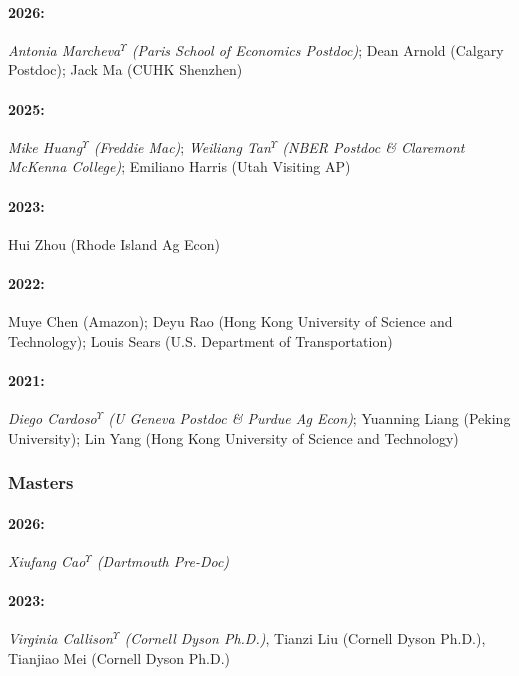 \documentclass[11pt]{res} %
\begin{document}
\begin{resume}
\paragraph{2026:} \textit{Antonia Marcheva$^\Upsilon$ (Paris School of Economics Postdoc)}; Dean Arnold (Calgary Postdoc); Jack Ma (CUHK Shenzhen)
\vspace{-.35in}
\paragraph{2025:} \textit{{Mike Huang}$^\Upsilon$ (Freddie Mac)}; \textit{Weiliang Tan$^\Upsilon$ (NBER Postdoc \& Claremont McKenna College)}; Emiliano Harris (Utah Visiting AP)
\vspace{-.35in}
\paragraph{2023:} Hui Zhou (Rhode Island Ag Econ)
\vspace{-.35in}
\paragraph{2022:} Muye Chen (Amazon); Deyu Rao (Hong Kong University of Science and Technology); Louis Sears (U.S. Department of Transportation)
\vspace{-.35in}
\paragraph{2021:} \textit{Diego Cardoso$^\Upsilon$ (U Geneva Postdoc \& Purdue Ag Econ)}; Yuanning Liang (Peking University); Lin Yang (Hong Kong University of Science and Technology)

\vspace{-.2in}
 
\subsubsection{Masters}\vspace{-.2in}
\paragraph{2026:} \textit{Xiufang Cao$^\Upsilon$ (Dartmouth Pre-Doc)}
\vspace{-.35in} 
\paragraph{2023:} \textit{Virginia Callison$^\Upsilon$ (Cornell Dyson Ph.D.)}, Tianzi Liu (Cornell Dyson Ph.D.), Tianjiao Mei (Cornell Dyson Ph.D.)
\vspace{-.35in} 

\end{resume}
\end{document}
